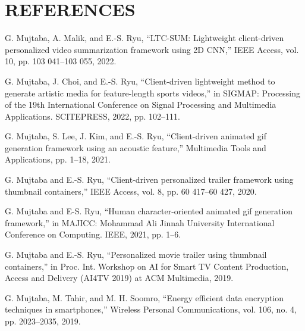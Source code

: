 \section*{REFERENCES}
\begin{enumerate}[label={[{\arabic*}]}, align=left, leftmargin=*]
    \item G. Mujtaba, A. Malik, and E.-S. Ryu, “LTC-SUM: Lightweight client-driven personalized video summarization framework using 2D CNN,” IEEE Access, vol. 10, pp. 103 041–103 055, 2022.
    
    \item G. Mujtaba, J. Choi, and E.-S. Ryu, “Client-driven lightweight method to generate artistic media for feature-length sports videos,” in SIGMAP: Processing of the 19th International Conference on Signal Processing and Multimedia Applications. SCITEPRESS, 2022, pp. 102–111.
    
    \item G. Mujtaba, S. Lee, J. Kim, and E.-S. Ryu, “Client-driven animated gif generation framework using an acoustic feature,” Multimedia Tools and Applications, pp. 1–18, 2021.
    
    \item G. Mujtaba and E.-S. Ryu, “Client-driven personalized trailer framework using thumbnail containers,” IEEE Access, vol. 8, pp. 60 417–60 427, 2020.
    
    \item G. Mujtaba and E-S. Ryu, “Human character-oriented animated gif generation framework,” in MAJICC: Mohammad Ali Jinnah University International Conference on Computing. IEEE, 2021, pp. 1–6.
    
    \item G. Mujtaba and E.-S. Ryu, “Personalized movie trailer using thumbnail containers,” in Proc. Int. Workshop on AI for Smart TV Content Production, Access and Delivery (AI4TV 2019) at ACM Multimedia, 2019.
    
    \item G. Mujtaba, M. Tahir, and M. H. Soomro, “Energy efficient data encryption techniques in smartphones,” Wireless Personal Communications, vol. 106, no. 4, pp. 2023–2035, 2019.
\end{enumerate}
